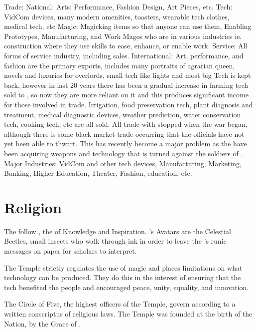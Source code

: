 \documentclass[blue]{GL2020}
\begin{document}
	Trade:		
National:	
Arts:		Performance, Fashion Design, Art Pieces, etc.
		Tech:		VidCom devices, many modern amenities, toasters, wearable tech clothes, medical tech, etc
		Magic:		Magicking items so that anyone can use them, Enabling Prototypes, Manufacturing, and Work Mages who are in various industries ie. construction where they use skills to ease, enhance, or enable work.
		Service:	All forms of service industry, including sales.
		International:	Art, performance, and fashion are the primary exports, includes many portraits of agrarian queen, novels and luxuries for overlords, small tech like lights and most big Tech is kept back, however in last 20 years there has been a gradual increase in farming tech sold to \pFarm{}, so now they are more reliant on it and this produces significant income for those involved in trade.  Irrigation, food preservation tech, plant diagnosis and treatment, medical diagnostic devices, weather prediction, water conservation tech, cooking tech, etc are all sold.  All trade with \pShip{} stopped when the war began, although there is some black market trade occurring that the officials have not yet been able to thwart.  This has recently become a major problem as the \pShippies{} have been acquiring \pTech{} weapons and technology that is turned against the soldiers of \pTech{}.
		Major Industries:  VidCom and other tech devices, Manufacturing, Marketing, Banking, Higher Education, Theater, Fashion, education, etc.
	






\section*{Religion}
The \pTechies{} follow \cTechGod{}, the \cTechGod{\God} of Knowledge and Inspiration. \cTechGod{}'s Avatars are the Celestial Beetles, small insects who walk through ink in order to leave the \cTechGod{\God}’s runic messages on paper for scholars to interpret.  

The Temple strictly regulates the use of magic and places limitations on what technology can be produced. They do this in the interest of ensuring that the tech benefited the people and encouraged peace, unity, equality, and innovation.

The Circle of Five, the highest officers of the Temple, govern according to a written conscriptus of religious laws. The Temple was founded at the birth of the Nation, by the Grace of \cTechGod{}.
\end{document}

